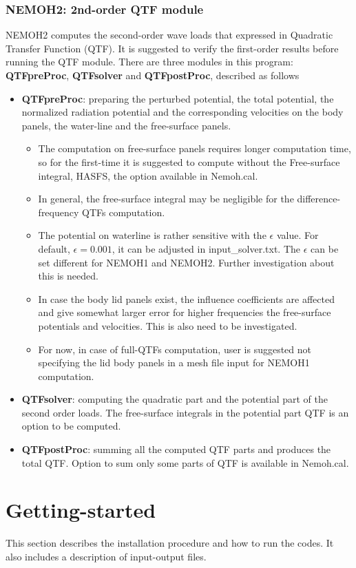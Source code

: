 \documentclass[12pt,a4paper,titlepage]{article}
\begin{document}
\subsubsection{NEMOH2: 2nd-order QTF module}
NEMOH2 computes the second-order wave loads that expressed in Quadratic Transfer Function (QTF). It is suggested to verify the first-order results before running the QTF module. There are three modules in this program: \textbf{QTFpreProc}, \textbf{QTFsolver} and \textbf{QTFpostProc}, described as follows
\begin{itemize}
\item \textbf{QTFpreProc}: preparing the perturbed potential, the total potential, the normalized radiation potential and the corresponding velocities on the body panels, the water-line and the free-surface panels.
\
\begin{itemize}
\item The computation on free-surface panels requires longer computation time, so for the first-time it is suggested to compute without the Free-surface integral, HASFS, the option available in Nemoh.cal.
\item In general, the free-surface integral may be negligible for the difference-frequency QTFs computation.
\item The potential on waterline is rather sensitive with the $\epsilon$ value. For default, $\epsilon=0.001$, it can be adjusted in input\_solver.txt. The $\epsilon$ can be set different for NEMOH1 and NEMOH2. Further investigation about this is needed.
\item In case the body lid panels exist, the influence coefficients are affected  and give somewhat larger error for higher frequencies the free-surface potentials and velocities. This is also need to be investigated.
\item For now, in case of full-QTFs computation, user is suggested not specifying the lid body panels in a mesh file input for NEMOH1 computation.
\end{itemize}
\item \textbf{QTFsolver}: computing the quadratic part and the potential part of the second order loads. The free-surface integrals in the potential part QTF is an option to be computed.
\item \textbf{QTFpostProc}: summing all the computed QTF parts and produces the total QTF. Option to sum only some parts of QTF is available in Nemoh.cal.
\end{itemize}

\section{Getting-started} \label{Sec:Getstarted}
This section describes the installation procedure and how to run the codes. It also includes a description of input-output files.
\end{document}
